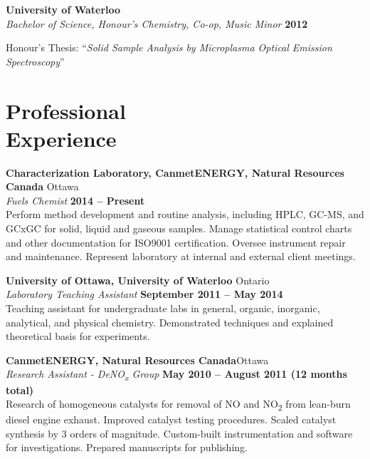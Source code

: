 \documentclass[margin,line]{resumecls}
\begin{document}
\begin{resume}
    \textbf{University of Waterloo}\\\vspace{1mm}%
    \textsl{Bachelor of Science, Honour's Chemistry, Co-op, Music Minor} \hfill \textbf{2012}\vspace{-3mm}\\\vspace{-1mm}%
    \begin{list2}
        \item Honour's Thesis: ``\textit{Solid Sample Analysis by Microplasma Optical Emission Spectroscopy}''
    \end{list2}

    \section{\mysidestyle Professional\\Experience}

    \textbf{Characterization Laboratory, CanmetENERGY, Natural Resources Canada} \hfill Ottawa \\\vspace{1mm}%
    \textsl{Fuels Chemist} \hfill \textbf{2014 -- Present}\\
    Perform method development and routine analysis, including HPLC, GC-MS, and GCxGC for solid, liquid and gaseous samples.
    Manage statistical control charts and other documentation for ISO9001 certification.
    Oversee instrument repair and maintenance.
    Represent laboratory at internal and external client meetings.


    \textbf{University of Ottawa, University of Waterloo} \hfill Ontario \\\vspace{1mm}%
    \textsl{Laboratory Teaching Assistant} \hfill \textbf{September 2011 -- May 2014}\\
    Teaching assistant for undergraduate labs in general, organic, inorganic, analytical, and physical chemistry.
    Demonstrated techniques and explained theoretical basis for experiments.

    \textbf{CanmetENERGY, Natural Resources Canada}\hfill Ottawa \\\vspace{1mm}%
    \textsl{Research Assistant - DeNO\textsubscript{x} Group} \hfill \textbf{May 2010 -- August 2011 (12 months total)}\\
    Research of homogeneous catalysts for removal of NO and NO\textsubscript{2} from lean-burn diesel engine exhaust.
    Improved catalyst testing procedures.
    Scaled catalyst synthesis by 3 orders of magnitude.
    Custom-built instrumentation and software for investigations.
    Prepared manuscripts for publishing.


\end{resume}
\end{document}
